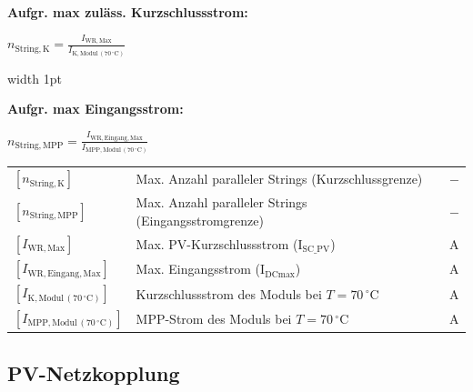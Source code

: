\begin{minipage}[t]{0.48\columnwidth}
\textbf{Aufgr. max zuläss. Kurzschlussstrom:}

$
\boxed{
n_{\mathrm{String,K}} = \frac{I_{\mathrm{WR,Max}}}{I_{\mathrm{K,Modul \, (70 \, ^\circ\mathrm{C})}}}
}
$
\end{minipage}
\hfill
\vrule width 1pt
\hfill
\begin{minipage}[t]{0.48\columnwidth}
\textbf{Aufgr. max Eingangsstrom:}

$
\boxed{
n_{\mathrm{String,MPP}} = \frac{I_{\mathrm{WR,Eingang,Max}}}{I_{\mathrm{MPP,Modul \, (70 \, ^\circ\mathrm{C})}}}
}
$
\end{minipage}

\vspace{0.1cm}

\renewcommand{\arraystretch}{1.2}
\begin{tabular}{@{} l p{6.5cm} l @{}}
    $[n_{\mathrm{String,K}}]$        & Max. Anzahl paralleler Strings (Kurzschlussgrenze) \dotfill & $-$ \\
    $[n_{\mathrm{String,MPP}}]$      & Max. Anzahl paralleler Strings (Eingangsstromgrenze) \dotfill & $-$ \\
    $[I_{\mathrm{WR,Max}}]$          & Max. PV-Kurzschlussstrom ($\mathrm{I_{SC\_PV}}$) \dotfill & $\mathrm{A}$ \\
    $[I_{\mathrm{WR,Eingang,Max}}]$  & Max. Eingangsstrom ($\mathrm{I_{DCmax}}$)\dotfill & $\mathrm{A}$ \\
    $[I_{\mathrm{K,Modul \, (70 \, ^\circ\mathrm{C})}}]$     & Kurzschlussstrom des Moduls bei $T = 70 \, ^\circ\mathrm{C}$ \dotfill & $\mathrm{A}$ \\
    $[I_{\mathrm{MPP,Modul \, (70 \, ^\circ\mathrm{C})}}]$   & MPP-Strom des Moduls bei $T = 70 \, ^\circ\mathrm{C}$ \dotfill & $\mathrm{A}$ \\
\end{tabular}


\subsection{PV-Netzkopplung}


